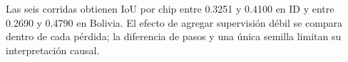 Las seis corridas obtienen IoU por chip entre 0.3251 y 0.4100 en ID y entre 0.2690 y 0.4790 en Bolivia. El efecto de agregar supervisión débil se compara dentro de cada pérdida; la diferencia de pasos y una única semilla limitan su interpretación causal.